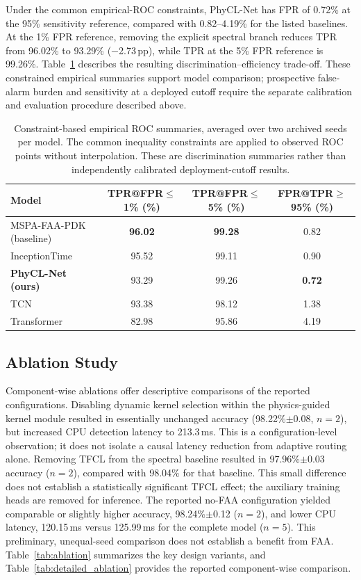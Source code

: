 \documentclass[jec]{acnsart}
\begin{document}
Under the common empirical-ROC constraints, PhyCL-Net has FPR of 0.72\% at the 95\% sensitivity reference, compared with 0.82--4.19\% for the listed baselines. At the 1\% FPR reference, removing the explicit spectral branch reduces TPR from 96.02\% to 93.29\% ($-$2.73\,pp), while TPR at the 5\% FPR reference is 99.26\%. Table~\ref{tab:safety} describes the resulting discrimination--efficiency trade-off. These constrained empirical summaries support model comparison; prospective false-alarm burden and sensitivity at a deployed cutoff require the separate calibration and evaluation procedure described above.

\begin{table}[htbp]
\caption{Constraint-based empirical ROC summaries, averaged over two archived seeds per model. The common inequality constraints are applied to observed ROC points without interpolation. These are discrimination summaries rather than independently calibrated deployment-cutoff results.}
\label{tab:safety}
\centering
\small
\begin{tabular}{lccc}
\toprule
Model & TPR@FPR$\leq$1\% (\%) & TPR@FPR$\leq$5\% (\%) & FPR@TPR$\geq$95\% (\%) \\
\midrule
MSPA-FAA-PDK (baseline) & \textbf{96.02} & \textbf{99.28} & 0.82 \\
InceptionTime & 95.52 & 99.11 & 0.90 \\
\textbf{PhyCL-Net (ours)} & 93.29 & 99.26 & \textbf{0.72} \\
TCN & 93.38 & 98.12 & 1.38 \\
Transformer & 82.98 & 95.86 & 4.19 \\
\bottomrule
\end{tabular}
\end{table}

\subsection{Ablation Study}
\label{sec:ablation}

Component-wise ablations offer descriptive comparisons of the reported configurations. Disabling dynamic kernel selection within the physics-guided kernel module resulted in essentially unchanged accuracy (98.22\%$\pm$0.08, $n{=}2$), but increased CPU detection latency to 213.3\,ms. This is a configuration-level observation; it does not isolate a causal latency reduction from adaptive routing alone. Removing TFCL from the spectral baseline resulted in 97.96\%$\pm$0.03 accuracy ($n{=}2$), compared with 98.04\% for that baseline. This small difference does not establish a statistically significant TFCL effect; the auxiliary training heads are removed for inference. The reported no-FAA configuration yielded comparable or slightly higher accuracy, 98.24\%$\pm$0.12 ($n{=}2$), and lower CPU latency, 120.15\,ms versus 125.99\,ms for the complete model ($n{=}5$). This preliminary, unequal-seed comparison does not establish a benefit from FAA. Table~\ref{tab:ablation} summarizes the key design variants, and Table~\ref{tab:detailed_ablation} provides the reported component-wise comparison.
\end{document}
